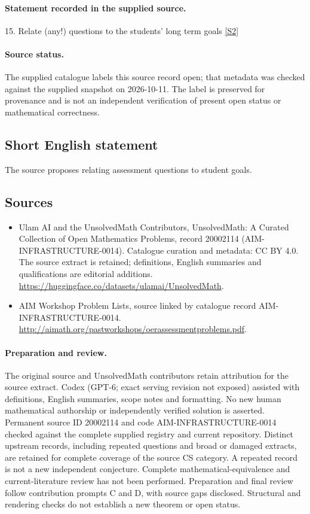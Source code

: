 \documentclass[11pt]{article}
\begin{document}
\paragraph{Statement recorded in the supplied source.}
15. Relate (any!) questions to the students' long term goals \href{http://aimath.org/pastworkshops/oerassessmentproblems.pdf}{[S2]}
\paragraph{Source status.}
The supplied catalogue labels this source record open; that metadata was checked against the supplied snapshot on 2026-10-11. The label is preserved for provenance and is not an independent verification of present open status or mathematical correctness.
\subsection{Short English statement}
The source proposes relating assessment questions to student goals.
\subsection{Sources}
\begin{itemize}
\item[S1] Ulam AI and the UnsolvedMath Contributors, UnsolvedMath: A Curated Collection of Open Mathematics Problems, record 20002114 (AIM-INFRASTRUCTURE-0014). Catalogue curation and metadata: CC BY 4.0. The source extract is retained; definitions, English summaries and qualifications are editorial additions.
\url{https://huggingface.co/datasets/ulamai/UnsolvedMath}.
\item[S2] AIM Workshop Problem Lists, source linked by catalogue record AIM-INFRASTRUCTURE-0014.
\url{http://aimath.org/pastworkshops/oerassessmentproblems.pdf}.
\end{itemize}
\paragraph{Preparation and review.}
The original source and UnsolvedMath contributors retain attribution for the source extract. Codex (GPT-6; exact serving revision not exposed) assisted with definitions, English summaries, scope notes and formatting. No new human mathematical authorship or independently verified solution is asserted. Permanent source ID 20002114 and code AIM-INFRASTRUCTURE-0014 checked against the complete supplied registry and current repository. Distinct upstream records, including repeated questions and broad or damaged extracts, are retained for complete coverage of the source CS category. A repeated record is not a new independent conjecture. Complete mathematical-equivalence and current-literature review has not been performed. Preparation and final review follow contribution prompts C and D, with source gaps disclosed. Structural and rendering checks do not establish a new theorem or open status.
\label{end:20002114}
\end{document}
